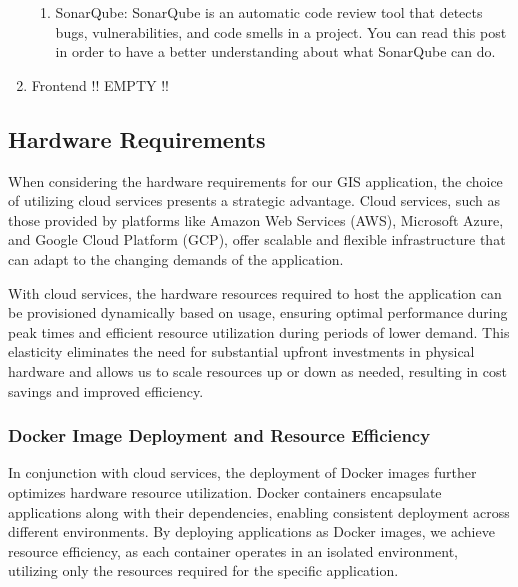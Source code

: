 \begin{enumerate}
\begin{enumerate}
        \item SonarQube: SonarQube is an automatic code review tool that detects bugs, vulnerabilities, and code smells in a project. You can read this post in order to have a better understanding about what SonarQube can do.
    \end{enumerate}

    \item Frontend !! EMPTY !!
    

\end{enumerate}


\subsection{Hardware Requirements}\label{subsec:hardware-requirements}
When considering the hardware requirements for our GIS application, the choice of utilizing cloud services presents a strategic advantage. Cloud services, such as those provided by platforms like Amazon Web Services (AWS), Microsoft Azure, and Google Cloud Platform (GCP), offer scalable and flexible infrastructure that can adapt to the changing demands of the application.

With cloud services, the hardware resources required to host the application can be provisioned dynamically based on usage, ensuring optimal performance during peak times and efficient resource utilization during periods of lower demand. This elasticity eliminates the need for substantial upfront investments in physical hardware and allows us to scale resources up or down as needed, resulting in cost savings and improved efficiency.

\subsubsection{Docker Image Deployment and Resource Efficiency}

In conjunction with cloud services, the deployment of Docker images further optimizes hardware resource utilization. Docker containers encapsulate applications along with their dependencies, enabling consistent deployment across different environments. By deploying applications as Docker images, we achieve resource efficiency, as each container operates in an isolated environment, utilizing only the resources required for the specific application. 

